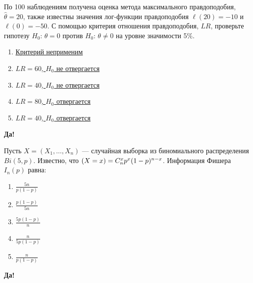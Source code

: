 \documentclass[t]{beamer}
\let\P\relax
\DeclareMathOperator{\P}{\mathbb{P}}
\begin{document}
 \begin{frame} \label{39-Yes} 
\begin{block}{39} 

  По 100 наблюдениям получена оценка метода максимального правдоподобия, $\hat\theta = 20$, также известны значения лог-функции правдоподобия $\ell(20) = -10$ и $\ell(0)= - 50$. С помощью критерия отношения правдоподобия, $LR$, проверьте гипотезу $H_0$: $\theta = 0$ против $H_0$: $\theta \neq 0$ на уровне значимости 5\%.
  


 \end{block} 
\begin{enumerate} 
\item[] \hyperlink{39-No}{\beamergotobutton{} Критерий неприменим}
\item[] \hyperlink{39-No}{\beamergotobutton{} $LR = 60$, $H_0$ не отвергается}
\item[] \hyperlink{39-No}{\beamergotobutton{} $LR = 40$, $H_0$ не отвергается}
\item[] \hyperlink{39-Yes}{\beamergotobutton{} $LR = 80$, $H_0$ отвергается }
\item[] \hyperlink{39-No}{\beamergotobutton{} $LR = 40$, $H_0$  отвергается}
\end{enumerate} 

 \textbf{Да!} 
 \hyperlink{40}{}\end{frame} 


 \begin{frame} \label{40-Yes} 
\begin{block}{40} 

Пусть $X = (X_1, \ldots , X_n)$ — случайная выборка из биномиального распределения $Bi(5, p)$. Известно, что $\P(X = x) =C_n^x p^x(1-p)^{n-x} $. Информация Фишера $I_n(p)$ равна:
 
 \end{block}
\begin{enumerate} 
\item[] \hyperlink{40-Yes}{\beamergotobutton{} $\frac{5n}{p(1-p)}$}
\item[] \hyperlink{40-No}{\beamergotobutton{} $\frac{p(1-p)}{5n}$}
\item[] \hyperlink{40-No}{\beamergotobutton{} $\frac{5p(1-p)}{n}$}
\item[] \hyperlink{40-No}{\beamergotobutton{}$\frac{n}{5p(1-p)}$}
\item[] \hyperlink{40-No}{\beamergotobutton{} $\frac{n}{p(1-p)}$}
\end{enumerate} 

 \textbf{Да!} 
 \hyperlink{41}{}\end{frame} 
\end{document}
